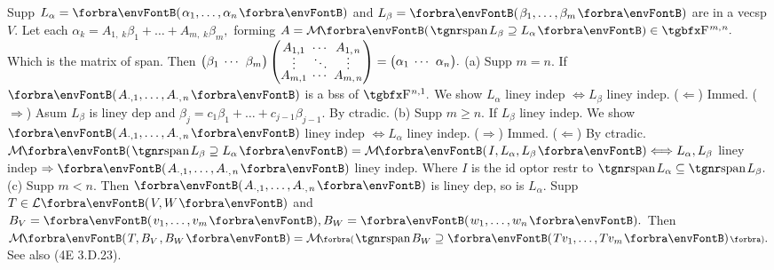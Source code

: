 \vspace{8pt}

\BulletPointX\NoteFor{[3.30, 32]}\;\TextB{}
Supp $L_{\alpha}=\Par{\alpha_1,\dots,\alpha_n}$ and $L_{\beta}=\Par{\beta_1,\dots,\beta_m}$ are in a vecsp $V.$\TextB{}
Let each $\alpha_k=A_{1,\;\!k}\beta_1+\dots+A_{m,\;\!k}\beta_m,$ forming $A=\Mt{\spn L_\beta\supseteq L_{\alpha}}\in\FbbP{m,\:\!n}.$\TextB{\vspace{3pt}}
Which is {\tgsl the matrix of span}. \;Then ${\normalsize\begin{pmatrix}\beta_1 &\hspace{-6pt} \cdots &\hspace{-6pt} \beta_m\end{pmatrix}\begin{pmatrix}
	A_{1,1} &\hspace{-6pt} \cdots &\hspace{-6pt} A_{1,\;\!n}\\[-4pt]
	\vdots	&\hspace{-6pt} \ddots &\hspace{-6pt} \vdots \\[-4pt]
	A_{m,1} &\hspace{-6pt} \cdots &\hspace{-6pt} A_{m,\;\!n}
\end{pmatrix}}={\normalsize\begin{pmatrix}\alpha_1 &\hspace{-6pt} \cdots &\hspace{-6pt} \alpha_n\end{pmatrix}}.$\TextB{\vspace{6pt}}
(a) Supp $m=n.$ If $\Par{A_{\cdot,1},\dots,A_{\cdot,\;\!n}}$ is a bss of $\FbbP{n,1}.$ We show $L_{\alpha}$ liney indep $\Longleftrightarrow L_{\beta}$ liney indep.\TextB{}
\Ha ($\Leftarrow$) Immed. ($\Rightarrow$) Asum $L_{\beta}$ is liney dep and $\beta_j=c_1\beta_1+\dots+c_{j-1}\beta_{j-1}.$ By ctradic.\PfEnd\vspace{2pt}\TextB{}
(b) Supp $m\geqslant n.$ If $L_{\beta}$ liney indep. We show $\Par{A_{\cdot,1},\dots,A_{\cdot,\;\!n}}$ liney indep $\Longleftrightarrow L_{\alpha}$ liney indep.\TextB{}
\Hb ($\Rightarrow$) Immed. ($\Leftarrow$) By ctradic.\PfEnd\TextB{}
\Hb\ANote $\Mt{\spn L_{\beta}\supseteq L_\alpha}=\Mt{I,L_{\alpha},L_{\beta}}\Longleftrightarrow L_{\alpha},L_{\beta}$ liney indep $\Rightarrow\Par{A_{\cdot,1},\dots,A_{\cdot,\;\!n}}$ liney indep.\parNot{\Hb\IndentB}
Where $I$ is the id optor restr to $\spn L_{\alpha}\subseteq\spn L_{\beta}.$
\vspace{3pt}\TextB{}
(c) Supp $m<n.$ Then $\Par{A_{\cdot,1},\dots,A_{\cdot,\;\!n}}$ is liney dep, so is $L_{\alpha}.$\TextB{\vspace{5pt}}
Supp $T\in\Lm{V,W}$ and $B_V=\Par{v_1,\dots,v_m},B_W=\Par{w_1,\dots,w_n}.$\TextB{}
Then $\Mt{T,B_V\hspace{1pt},B_W}=\Mt[\BigPar]{\spn B_W\supseteq\Par{Tv_1,\dots,Tv_m}}.$ \;See also (4E 3.D.23).
\SepLine

